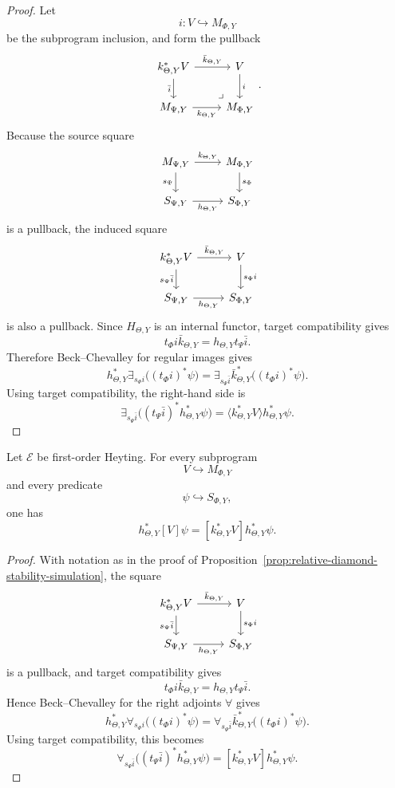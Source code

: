 \begin{proof}
Let
\[
i:V\hookrightarrow M_{\Phi,Y}
\]
be the subprogram inclusion, and form the pullback
\[
\begin{tikzcd}
k_{\Theta,Y}^\ast V \arrow[r,"\bar k_{\Theta,Y}"] \arrow[d,"\bar i"']
&
V \arrow[d,"i"]
\\
M_{\Psi,Y} \arrow[r,"k_{\Theta,Y}"']
&
M_{\Phi,Y}
\arrow[ul,phantom,very near start,"\lrcorner"]
\end{tikzcd}
.
\]
Because the source square
\[
\begin{tikzcd}
M_{\Psi,Y} \arrow[r,"k_{\Theta,Y}"] \arrow[d,"s_\Psi"']
&
M_{\Phi,Y} \arrow[d,"s_\Phi"]
\\
S_{\Psi,Y} \arrow[r,"h_{\Theta,Y}"']
&
S_{\Phi,Y}
\end{tikzcd}
\]
is a pullback, the induced square
\[
\begin{tikzcd}
k_{\Theta,Y}^\ast V
\arrow[r,"\bar k_{\Theta,Y}"]
\arrow[d,"s_\Psi\bar i"']
&
V
\arrow[d,"s_\Phi i"]
\\
S_{\Psi,Y}
\arrow[r,"h_{\Theta,Y}"']
&
S_{\Phi,Y}
\end{tikzcd}
\]
is also a pullback. Since \(H_{\Theta,Y}\) is an internal functor, target
compatibility gives
\[
t_\Phi i\bar k_{\Theta,Y}=h_{\Theta,Y}t_\Psi\bar i.
\]
Therefore Beck--Chevalley for regular images gives
\[
h_{\Theta,Y}^\ast
\exists_{s_\Phi i}\bigl((t_\Phi i)^\ast\psi\bigr)
=
\exists_{s_\Psi\bar i}
\bar k_{\Theta,Y}^\ast\bigl((t_\Phi i)^\ast\psi\bigr).
\]
Using target compatibility, the right-hand side is
\[
\exists_{s_\Psi\bar i}
\bigl((t_\Psi\bar i)^\ast h_{\Theta,Y}^\ast\psi\bigr)
=
\langle k_{\Theta,Y}^\ast V\rangle h_{\Theta,Y}^\ast\psi.
\]
\end{proof}

\begin{proposition}
\label{prop:relative-box-stability-simulation}
Let \(\mathcal E\) be first-order Heyting. For every subprogram
\[
V\hookrightarrow M_{\Phi,Y}
\]
and every predicate
\[
\psi\hookrightarrow S_{\Phi,Y},
\]
one has
\[
h_{\Theta,Y}^\ast[V]\psi
=
[k_{\Theta,Y}^\ast V]h_{\Theta,Y}^\ast\psi.
\]
\end{proposition}

\begin{proof}
With notation as in the proof of
Proposition~\ref{prop:relative-diamond-stability-simulation}, the square
\[
\begin{tikzcd}
k_{\Theta,Y}^\ast V
\arrow[r,"\bar k_{\Theta,Y}"]
\arrow[d,"s_\Psi\bar i"']
&
V
\arrow[d,"s_\Phi i"]
\\
S_{\Psi,Y}
\arrow[r,"h_{\Theta,Y}"']
&
S_{\Phi,Y}
\end{tikzcd}
\]
is a pullback, and target compatibility gives
\[
t_\Phi i\bar k_{\Theta,Y}=h_{\Theta,Y}t_\Psi\bar i.
\]
Hence Beck--Chevalley for the right adjoints \(\forall\) gives
\[
h_{\Theta,Y}^\ast
\forall_{s_\Phi i}\bigl((t_\Phi i)^\ast\psi\bigr)
=
\forall_{s_\Psi\bar i}
\bar k_{\Theta,Y}^\ast\bigl((t_\Phi i)^\ast\psi\bigr).
\]
Using target compatibility, this becomes
\[
\forall_{s_\Psi\bar i}
\bigl((t_\Psi\bar i)^\ast h_{\Theta,Y}^\ast\psi\bigr)
=
[k_{\Theta,Y}^\ast V]h_{\Theta,Y}^\ast\psi.
\]
\end{proof}

